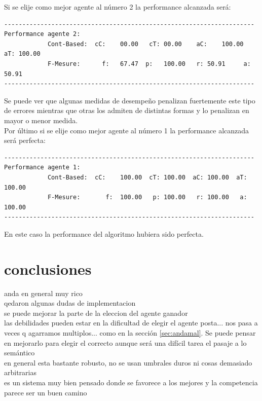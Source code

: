 \documentclass[12pt,a4paper,titlepage]{report}
\begin{document}
Si se elije como mejor agente al número 2 la performance alcanzada será:
\begin{verbatim}
---------------------------------------------------------------------
Performance agente 2:
        	Cont-Based:	 cC:	00.00	cT:	00.00	 aC:	100.00	aT:	100.00
        	F-Mesure: 	   f:	67.47  p:	100.00	 r:	50.91	  a:	50.91
---------------------------------------------------------------------
\end{verbatim}
Se puede ver que algunas medidas de desempeño penalizan fuertemente este tipo de errores mientras que otras los admiten de distintas formas y lo penalizan en mayor o menor medida.\\

Por último si se elije como mejor agente al número 1 la performance alcanzada será perfecta:
\begin{verbatim}
---------------------------------------------------------------------
Performance agente 1:
        	Cont-Based:	 cC:	100.00	cT:	100.00	aC:	100.00	aT:	100.00
        	F-Mesure:	    f:	100.00	 p:	100.00	 r:	100.00	 a:	100.00
---------------------------------------------------------------------
\end{verbatim}

En este caso la performance del algoritmo hubiera sido perfecta.


\section{conclusiones}

anda en general muy rico\\

qedaron algunas dudas de implementacion\\

se puede mejorar la parte de la eleccion del agente ganador\\

las debilidades pueden estar en la dificultad de elegir el agente posta... nos pasa a veces q agarramos multiplos... como en la sección \ref{sec:andamal}. Se puede pensar en mejorarlo para elegir el correcto aunque será una difícil tarea el pasaje a lo semántico\\

en general esta bastante robusto, no se usan umbrales duros ni cosas demasiado arbitrarias\\

es un sistema muy bien pensado donde se favorece a los mejores y la competencia parece ser un buen camino\\
\end{document}
